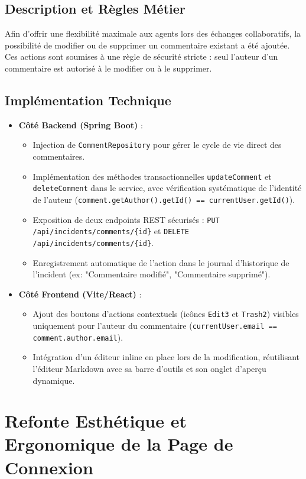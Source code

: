 \documentclass[12pt,a4paper]{article}
\begin{document}
\subsection{Description et Règles Métier}
Afin d'offrir une flexibilité maximale aux agents lors des échanges collaboratifs, la possibilité de modifier ou de supprimer un commentaire existant a été ajoutée. Ces actions sont soumises à une règle de sécurité stricte : seul l'auteur d'un commentaire est autorisé à le modifier ou à le supprimer.

\subsection{Implémentation Technique}
\begin{itemize}
    \item \textbf{Côté Backend (Spring Boot)} :
    \begin{itemize}
        \item Injection de \texttt{CommentRepository} pour gérer le cycle de vie direct des commentaires.
        \item Implémentation des méthodes transactionnelles \texttt{updateComment} et \texttt{deleteComment} dans le service, avec vérification systématique de l'identité de l'auteur (\texttt{comment.getAuthor().getId() == currentUser.getId()}).
        \item Exposition de deux endpoints REST sécurisés : \texttt{PUT /api/incidents/comments/\{id\}} et \texttt{DELETE /api/incidents/comments/\{id\}}.
        \item Enregistrement automatique de l'action dans le journal d'historique de l'incident (ex: "Commentaire modifié", "Commentaire supprimé").
    \end{itemize}
    \item \textbf{Côté Frontend (Vite/React)} :
    \begin{itemize}
        \item Ajout des boutons d'actions contextuels (icônes \texttt{Edit3} et \texttt{Trash2}) visibles uniquement pour l'auteur du commentaire (\texttt{currentUser.email == comment.author.email}).
        \item Intégration d'un éditeur inline en place lors de la modification, réutilisant l'éditeur Markdown avec sa barre d'outils et son onglet d'aperçu dynamique.
    \end{itemize}
\end{itemize}

\section{Refonte Esthétique et Ergonomique de la Page de Connexion}
\end{document}
